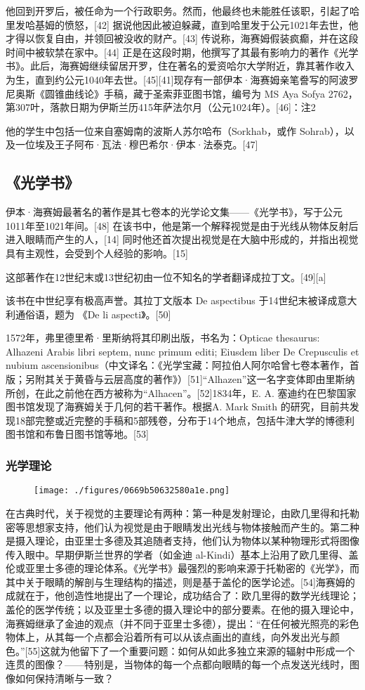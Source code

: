 他回到开罗后，被任命为一个行政职务。然而，他最终也未能胜任该职，引起了哈里发哈基姆的愤怒，[42] 据说他因此被迫躲藏，直到哈里发于公元1021年去世，他才得以恢复自由，并领回被没收的财产。[43] 传说称，海赛姆假装疯癫，并在这段时间中被软禁在家中。[44] 正是在这段时期，他撰写了其最有影响力的著作《光学书》。此后，海赛姆继续留居开罗，住在著名的爱资哈尔大学附近，靠其著作收入为生，直到约公元1040年去世。[45][41]现存有一部伊本·海赛姆亲笔誊写的阿波罗尼奥斯《圆锥曲线论》手稿，藏于圣索菲亚图书馆，编号为 MS Aya Sofya 2762，第307叶，落款日期为伊斯兰历415年萨法尔月（公元1024年）。[46]：注2

他的学生中包括一位来自塞姆南的波斯人苏尔哈布（Sorkhab，或作 Sohrab），以及一位埃及王子阿布·瓦法·穆巴希尔·伊本·法泰克。[47]
\subsection{《光学书》}
伊本·海赛姆最著名的著作是其七卷本的光学论文集——《光学书》，写于公元1011年至1021年间。[48] 在该书中，他是第一个解释视觉是由于光线从物体反射后进入眼睛而产生的人，[14] 同时他还首次提出视觉是在大脑中形成的，并指出视觉具有主观性，会受到个人经验的影响。[15]

这部著作在12世纪末或13世纪初由一位不知名的学者翻译成拉丁文。[49][a]

该书在中世纪享有极高声誉。其拉丁文版本 De aspectibus 于14世纪末被译成意大利通俗语，题为 《De li aspecti》。[50]

1572年，弗里德里希·里斯纳将其印刷出版，书名为：Opticae thesaurus: Alhazeni Arabis libri septem, nunc primum editi; Eiusdem liber De Crepusculis et nubium ascensionibus（中文译名：《光学宝藏：阿拉伯人阿尔哈曾七卷本著作，首版；另附其关于黄昏与云层高度的著作》）[51]“Alhazen”这一名字变体即由里斯纳所创，在此之前他在西方被称为“Alhacen”。[52]1834年，E. A. 塞迪约在巴黎国家图书馆发现了海赛姆关于几何的若干著作。根据A. Mark Smith 的研究，目前共发现18部完整或近完整的手稿和5部残卷，分布于14个地点，包括牛津大学的博德利图书馆和布鲁日图书馆等地。[53]
\subsubsection{光学理论}
\begin{figure}[ht]
\centering
\texttt{[image: ./figures/0669b50632580a1e.png]}
\caption{} \label{fig_YBH_1}
\end{figure}
在古典时代，关于视觉的主要理论有两种：第一种是发射理论，由欧几里得和托勒密等思想家支持，他们认为视觉是由于眼睛发出光线与物体接触而产生的。第二种是摄入理论，由亚里士多德及其追随者支持，他们认为物体以某种物理形式将图像传入眼中。早期伊斯兰世界的学者（如金迪 al-Kindi）基本上沿用了欧几里得、盖伦或亚里士多德的理论体系。《光学书》最强烈的影响来源于托勒密的《光学》，而其中关于眼睛的解剖与生理结构的描述，则是基于盖伦的医学论述。[54]海赛姆的成就在于，他创造性地提出了一个理论，成功结合了：欧几里得的数学光线理论；盖伦的医学传统；以及亚里士多德的摄入理论中的部分要素。在他的摄入理论中，海赛姆继承了金迪的观点（并不同于亚里士多德），提出：“在任何被光照亮的彩色物体上，从其每一个点都会沿着所有可以从该点画出的直线，向外发出光与颜色。”[55]这就为他留下了一个重要问题：如何从如此多独立来源的辐射中形成一个连贯的图像？——特别是，当物体的每一个点都向眼睛的每一个点发送光线时，图像如何保持清晰与一致？

